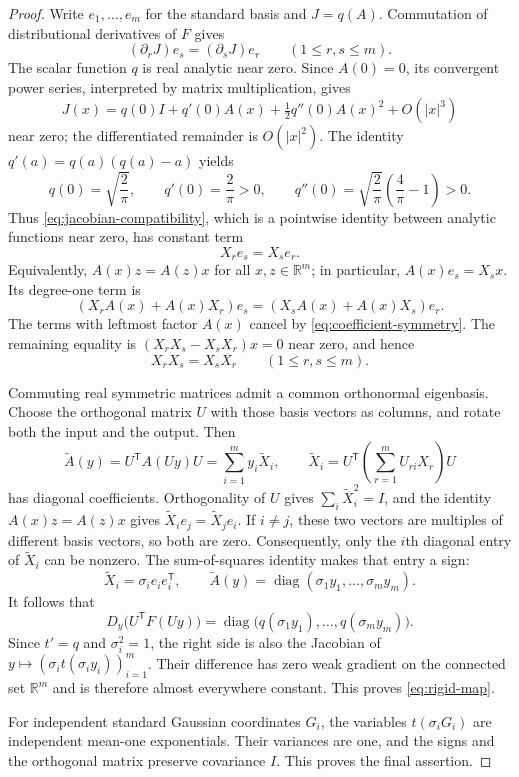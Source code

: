 \documentclass[11pt]{article}
\newcommand{\R}{\mathbb R}
\theoremstyle{definition}
\theoremstyle{remark}
\numberwithin{equation}{section}
\begin{document}
\begin{proof}
Write $e_1,\ldots,e_m$ for the standard basis and $J=q(A)$.
Commutation of distributional derivatives of $F$ gives
\begin{equation}\label{eq:jacobian-compatibility}
  (\partial_rJ)e_s=(\partial_sJ)e_r
  \qquad(1\le r,s\le m).
\end{equation}
The scalar function $q$ is real analytic near zero.  Since $A(0)=0$, its
convergent power series, interpreted by matrix multiplication, gives
\[
  J(x)=q(0)I+q'(0)A(x)+\tfrac12q''(0)A(x)^2+O(|x|^3)
\]
near zero; the differentiated remainder is $O(|x|^2)$.
The identity $q'(a)=q(a)(q(a)-a)$ yields
\[
  q(0)=\sqrt{\frac2\pi},\qquad
  q'(0)=\frac2\pi>0,\qquad
  q''(0)=\sqrt{\frac2\pi}\left(\frac4\pi-1\right)>0.
\]
Thus \eqref{eq:jacobian-compatibility}, which is a pointwise identity
between analytic functions near zero, has constant term
\begin{equation}\label{eq:coefficient-symmetry}
  X_re_s=X_se_r.
\end{equation}
Equivalently, $A(x)z=A(z)x$ for all $x,z\in\R^m$; in particular,
$A(x)e_s=X_sx$.  Its degree-one term is
\[
  (X_rA(x)+A(x)X_r)e_s
  =(X_sA(x)+A(x)X_s)e_r.
\]
The terms with leftmost factor $A(x)$ cancel by
\eqref{eq:coefficient-symmetry}.  The remaining equality is
$(X_rX_s-X_sX_r)x=0$ near zero, and hence
\begin{equation}\label{eq:coefficients-commute}
  X_rX_s=X_sX_r\qquad(1\le r,s\le m).
\end{equation}

Commuting real symmetric matrices admit a common orthonormal eigenbasis.
Choose the orthogonal matrix $U$ with those basis vectors as columns,
and rotate both the input and the output.  Then
\[
  \widetilde A(y)=U^{\mathsf T}A(Uy)U
     =\sum_{i=1}^m y_i\widetilde X_i,
  \qquad
  \widetilde X_i=U^{\mathsf T}
      \left(\sum_{r=1}^m U_{ri}X_r\right)U
\]
has diagonal coefficients.  Orthogonality of $U$ gives
$\sum_i\widetilde X_i^2=I$, and the identity $A(x)z=A(z)x$ gives
$\widetilde X_i e_j=\widetilde X_j e_i$.  If $i\ne j$, these two vectors
are multiples of different basis vectors, so both are zero.
Consequently, only the $i$th diagonal entry of $\widetilde X_i$ can be
nonzero.  The sum-of-squares identity makes that entry a sign:
\[
  \widetilde X_i=\sigma_i e_ie_i^{\mathsf T},
  \qquad
  \widetilde A(y)=\operatorname{diag}(\sigma_1y_1,\ldots,\sigma_my_m).
\]
It follows that
\[
  D_y\bigl(U^{\mathsf T}F(Uy)\bigr)
   =\operatorname{diag}\bigl(q(\sigma_1y_1),\ldots,q(\sigma_my_m)\bigr).
\]
Since $t'=q$ and $\sigma_i^2=1$, the right side is also the Jacobian of
$y\mapsto(\sigma_i t(\sigma_i y_i))_{i=1}^m$.
Their difference has zero weak gradient on the connected set $\R^m$
and is therefore almost everywhere constant.  This proves
\eqref{eq:rigid-map}.

For independent standard Gaussian coordinates $G_i$, the variables
$t(\sigma_iG_i)$ are independent mean-one exponentials.  Their variances
are one, and the signs and the orthogonal matrix preserve covariance
$I$.  This proves the final assertion.
\end{proof}
\end{document}

